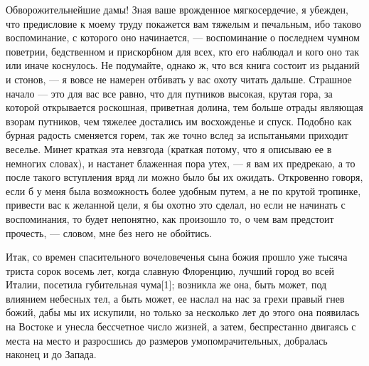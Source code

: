 \bigskip{}

Обворожительнейшие дамы! Зная ваше врожденное мягкосердечие, я убежден, что предисловие к моему труду покажется вам тяжелым и печальным, ибо таково воспоминание, с которого оно начинается, --- воспоминание о последнем чумном поветрии, бедственном и прискорбном для всех, кто его наблюдал и кого оно так или иначе коснулось. Не подумайте, однако ж, что вся книга состоит из рыданий и стонов, --- я вовсе не намерен отбивать у вас охоту читать дальше. Страшное начало --- это для вас все равно, что для путников высокая, крутая гора, за которой открывается роскошная, приветная долина, тем больше отрады являющая взорам путников, чем тяжелее достались им восхожденье и спуск. Подобно как бурная радость сменяется горем, так же точно вслед за испытаньями приходит веселье. Минет краткая эта невзгода (краткая потому, что я описываю ее в немногих словах), и настанет блаженная пора утех, --- я вам их предрекаю, а то после такого вступления вряд ли можно было бы их ожидать. Откровенно говоря, если б у меня была возможность более удобным путем, а не по крутой тропинке, привести вас к желанной цели, я бы охотно это сделал, но если не начинать с воспоминания, то будет непонятно, как произошло то, о чем вам предстоит прочесть, --- словом, мне без него не обойтись.


Итак, со времен спасительного вочеловеченья сына божия прошло уже тысяча триста сорок восемь лет, когда славную Флоренцию, лучший город во всей Италии, посетила губительная чума[1]; возникла же она, быть может, под влиянием небесных тел, а быть может, ее наслал на нас за грехи правый гнев божий, дабы мы их искупили, но только за несколько лет до этого она появилась на Востоке и унесла бессчетное число жизней, а затем, беспрестанно двигаясь с места на место и разросшись до размеров умопомрачительных, добралась наконец и до Запада.
